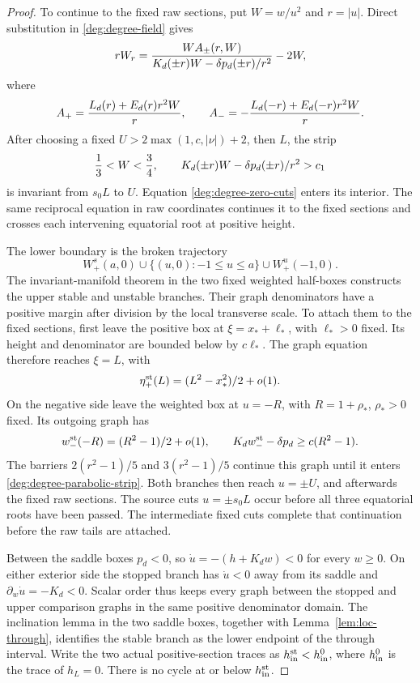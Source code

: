 \begin{proof}
To continue to the fixed raw sections, put \(W=w/u^2\) and
\(r=|u|\).  Direct substitution in \eqref{deg:degree-field} gives
\begin{equation}
 rW_r={WA_\pm(r,W)\over
 K_d(\pm r)W-\delta p_d(\pm r)/r^2}-2W,
 \label{deg:degree-reciprocal}
\end{equation}
where
\[
 A_+={L_d(r)+E_d(r)r^2W\over r},\qquad
 A_-=-{L_d(-r)+E_d(-r)r^2W\over r}.
\]
After choosing a fixed \(U>2\max(1,c,|\nu|)+2\), then \(L\), the
strip
\begin{equation}
 {1\over3}<W<{3\over4},\qquad
 K_d(\pm r)W-\delta p_d(\pm r)/r^2>c_1
 \label{deg:degree-parabolic-strip}
\end{equation}
is invariant from \(s_0L\) to \(U\).  Equation
\eqref{deg:degree-zero-cuts} enters its interior.  The same reciprocal
equation in raw coordinates continues it to the fixed sections and
crosses each intervening equatorial root at positive height.

The lower boundary is the broken trajectory
\begin{equation}
 W^s_+(a,0)\cup\{(u,0):-1\le u\le a\}\cup W^u_+(-1,0).
 \label{deg:degree-stopped-curve}
\end{equation}
The invariant-manifold theorem in the two fixed weighted half-boxes
constructs the upper stable and unstable branches.  Their graph
denominators have a positive margin after division by the local
transverse scale.  To attach them to the fixed sections, first leave
the positive box at \(\xi=x_*+\ell_*\), with \(\ell_*>0\) fixed.
Its height and denominator are bounded below by \(c\ell_*\).
The graph equation therefore reaches \(\xi=L\), with
\[
 \eta_+^{\rm st}(L)=(L^2-x_*^2)/2+o(1).
\]
On the negative side leave the weighted box at \(u=-R\), with
\(R=1+\rho_*\), \(\rho_*>0\) fixed.  Its outgoing graph has
\[
 w_-^{\rm st}(-R)=(R^2-1)/2+o(1),\qquad
 K_dw_-^{\rm st}-\delta p_d\ge c(R^2-1).
\]
The barriers \(2(r^2-1)/5\) and \(3(r^2-1)/5\) continue this
graph until it enters \eqref{deg:degree-parabolic-strip}.  Both
branches then reach \(u=\pm U\), and afterwards the fixed raw
sections.  The source cuts \(u=\pm s_0L\) occur before all three equatorial
roots have been passed. The intermediate fixed cuts complete that
continuation before the raw tails are attached.

Between the saddle boxes \(p_d<0\), so
\(\dot u=-(h+K_dw)<0\) for every \(w\ge0\).  On either exterior
side the stopped branch has \(\dot u<0\) away from its saddle and
\(\partial_w\dot u=-K_d<0\).  Scalar order thus keeps every graph
between the stopped and upper comparison graphs in the same positive
denominator domain.  The inclination lemma in the two saddle boxes,
together with Lemma~\ref{lem:loc-through}, identifies the stable
branch as the lower endpoint of the through interval.  Write the two
actual positive-section traces as
\(h_{\rm in}^{\rm st}<h_{\rm in}^0\), where \(h_{\rm in}^0\) is the
trace of \(h_L=0\). There is no cycle at or below
\(h_{\rm in}^{\rm st}\).


\end{proof}
